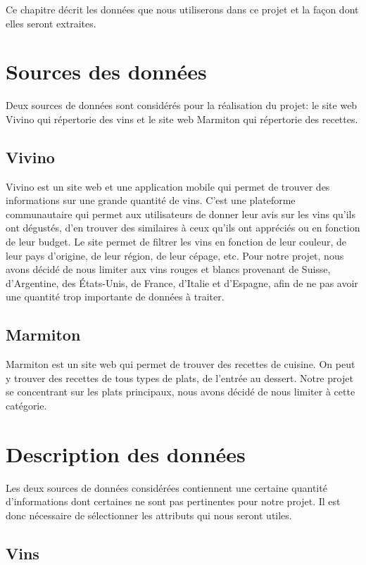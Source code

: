 Ce chapitre décrit les données que nous utiliserons dans ce projet et la façon dont elles seront extraites.

\section{Sources des données}

Deux sources de données sont considérés pour la réalisation du projet: le site web Vivino qui répertorie des vins et le site web Marmiton qui répertorie des recettes.

\subsection{Vivino}
Vivino est un site web et une application mobile qui permet de trouver des informations sur une grande quantité de vins.
C'est une plateforme communautaire qui permet aux utilisateurs de donner leur avis sur les vins qu'ils ont dégustés,
d'en trouver des similaires à ceux qu'ils ont appréciés ou en fonction de leur budget.
Le site permet de filtrer les vins en fonction de leur couleur, de leur pays d'origine, de leur région, de leur cépage, etc.
Pour notre projet, nous avons décidé de nous limiter aux vins rouges et blancs provenant de Suisse, d'Argentine, des États-Unis,
de France, d'Italie et d'Espagne, afin de ne pas avoir une quantité trop importante de données à traiter.

\subsection{Marmiton}
Marmiton est un site web qui permet de trouver des recettes de cuisine.
On peut y trouver des recettes de tous types de plats, de l'entrée au dessert.
Notre projet se concentrant sur les plats principaux, nous avons décidé de nous limiter à cette catégorie.

\section{Description des données}

Les deux sources de données considérées contiennent une certaine quantité d'informations dont certaines ne sont pas pertinentes pour notre projet. Il est donc nécessaire de sélectionner les attributs qui nous seront utiles.

\subsection{Vins}

